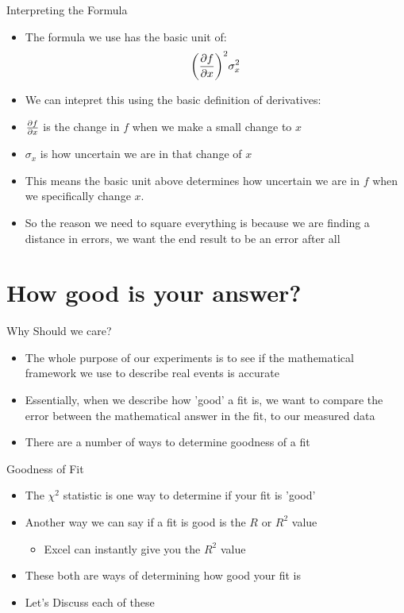 \documentclass{beamer}
\begin{document}
\begin{frame}{Interpreting the Formula}
  \begin{itemize}
  \item The formula we use has the basic unit of:
    \begin{align*}
      \qty(\pdv{f}{x})^2\sigma_x^2
    \end{align*}
  \item We can intepret this using the basic definition of derivatives:
  \item $\pdv{f}{x}$ is the change in $f$  when we make a small change to $x$
  \item $\sigma_x$ is how uncertain we are in that change of $x$
  \item This means the basic unit above determines how uncertain we are in $f$ when we specifically change $x$.
  \item So the reason we need to square everything is because we are finding a distance in errors, we want the end result to be an error after all
  \end{itemize}
\end{frame}

\section{How good is your answer?}
\begin{frame}{Why Should we care?}
  \begin{itemize}
  \item The whole purpose of our experiments is to see if the mathematical framework we use to describe real events is accurate
  \item Essentially, when we describe how 'good' a fit is, we want to compare the error between the mathematical answer in the fit, to our measured data
  \item There are a number of ways to determine goodness of a fit
  \end{itemize}
\end{frame}

\begin{frame}{Goodness of Fit}
  \begin{itemize}
  \item The $\chi^2$ statistic is one way to determine if your fit is 'good'
  \item Another way we can say if a fit is good is the $R$ or $R^2$ value
    \begin{itemize}
    \item Excel can instantly give you the $R^2$ value
    \end{itemize}
  \item These both are ways of determining how good your fit is
  \item Let's Discuss each of these
  \end{itemize}
\end{frame}
\end{document}

